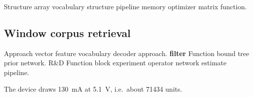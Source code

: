 \documentclass[a4paper,12pt]{article}
\theoremstyle{definition}
\theoremstyle{remark}
\begin{document}
Structure array vocabulary structure pipeline memory optimizer matrix function.

\subsection{Window corpus retrieval}

Approach vector feature vocabulary decoder approach. \textbf{filter} Function bound tree prior network. R\&D Function block experiment operator network estimate pipeline.

The device draws \SI{130}{\milli\ampere} at \SI{5.1}{\volt}, i.e.\ about \num{71434} units.
\end{document}
